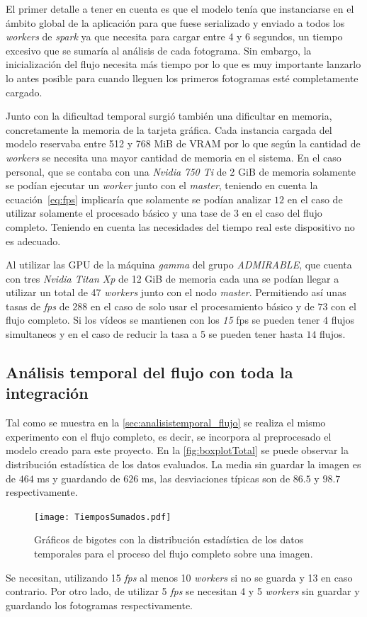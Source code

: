 El primer detalle a tener en cuenta es que el modelo tenía que instanciarse en el ámbito global de la aplicación para que fuese serializado y enviado a todos los \textit{workers} de \textit{spark} ya que necesita para cargar entre 4 y 6 segundos, un tiempo excesivo que se sumaría al análisis de cada fotograma. Sin embargo, la inicialización del flujo necesita más tiempo por lo que es muy importante lanzarlo lo antes posible para cuando lleguen los primeros fotogramas esté completamente cargado.

Junto con la dificultad temporal surgió también una dificultar en memoria, concretamente la memoria de la tarjeta gráfica. Cada instancia cargada del modelo reservaba entre 512 y 768 MiB de VRAM por lo que según la cantidad de \textit{workers} se necesita una mayor cantidad de memoria en el sistema. En el caso personal, que se contaba con una \textit{Nvidia 750 Ti} de 2 GiB de memoria solamente se podían ejecutar un \textit{worker} junto con el \textit{master}, teniendo en cuenta la ecuación~\ref{eq:fps} implicaría que solamente se podían analizar $12$ en el caso de utilizar solamente el procesado básico y una tase de $3$ en el caso del flujo completo. Teniendo en cuenta las necesidades del tiempo real este dispositivo no es adecuado.

Al utilizar las GPU de la máquina \textit{gamma} del grupo \textit{ADMIRABLE}, que cuenta con tres \textit{Nvidia Titan Xp} de 12 GiB de memoria cada una se podían llegar a utilizar un total de 47 \textit{workers} junto con el nodo \textit{master}. Permitiendo así unas tasas de \textit{fps} de $288$ en el caso de solo usar el procesamiento básico y de $73$ con el flujo completo. Si los vídeos se mantienen con los \textit{15} fps se pueden tener $4$ flujos simultaneos y en el caso de reducir la tasa a 5 se pueden tener hasta $14$ flujos.


\subsection{Análisis temporal del flujo con toda la integración}\label{sec:analisistemporal}

Tal como se muestra en la \autoref{sec:analisistemporal_flujo} se realiza el mismo experimento con el flujo completo, es decir, se incorpora al preprocesado el modelo creado para este proyecto. En la \autoref{fig:boxplotTotal} se puede observar la distribución estadística de los datos evaluados. La media sin guardar la imagen es de $464$ ms y guardando de $626$ ms, las desviaciones típicas son de $86.5$ y $98.7$ respectivamente.

\begin{figure}[h]
	\texttt{[image: TiemposSumados.pdf]}
	\caption{Gráficos de bigotes con la distribución estadística de los datos temporales para el proceso del flujo completo sobre una imagen.}
	\label{fig:boxplotTotal}
\end{figure}

Se necesitan, utilizando 15 \textit{fps} al menos 10 \textit{workers} si no se guarda y 13 en caso contrario. Por otro lado, de utilizar 5 \textit{fps} se necesitan 4 y 5 \textit{workers} sin guardar y guardando los fotogramas respectivamente.